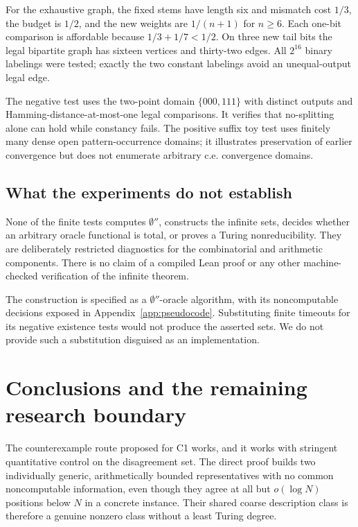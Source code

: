 \documentclass[11pt,a4paper]{article}
\theoremstyle{definition}
\theoremstyle{remark}
\begin{document}
For the exhaustive graph, the fixed stems have length six and mismatch cost $1/3$, the budget is $1/2$, and the new weights are $1/(n+1)$ for $n\geq6$. Each one-bit comparison is affordable because $1/3+1/7<1/2$. On three new tail bits the legal bipartite graph has sixteen vertices and thirty-two edges. All $2^{16}$ binary labelings were tested; exactly the two constant labelings avoid an unequal-output legal edge.

The negative test uses the two-point domain $\{000,111\}$ with distinct outputs and Hamming-distance-at-most-one legal comparisons. It verifies that no-splitting alone can hold while constancy fails. The positive suffix toy test uses finitely many dense open pattern-occurrence domains; it illustrates preservation of earlier convergence but does not enumerate arbitrary c.e. convergence domains.

\subsection{What the experiments do not establish}
None of the finite tests computes $\emptyset''$, constructs the infinite sets, decides whether an arbitrary oracle functional is total, or proves a Turing nonreducibility. They are deliberately restricted diagnostics for the combinatorial and arithmetic components. There is no claim of a compiled Lean proof or any other machine-checked verification of the infinite theorem.

The construction is specified as a $\emptyset''$-oracle algorithm, with its noncomputable decisions exposed in Appendix~\ref{app:pseudocode}. Substituting finite timeouts for its negative existence tests would not produce the asserted sets. We do not provide such a substitution disguised as an implementation.

\section{Conclusions and the remaining research boundary}\label{sec:conclusion}
The counterexample route proposed for C1 works, and it works with stringent quantitative control on the disagreement set. The direct proof builds two individually generic, arithmetically bounded representatives with no common noncomputable information, even though they agree at all but $o(\log N)$ positions below $N$ in a concrete instance. Their shared coarse description class is therefore a genuine nonzero class without a least Turing degree.
\end{document}
